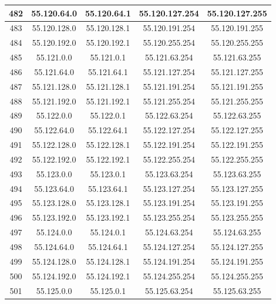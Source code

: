 \documentclass[letterpaper,12pt]{article}
\begin{document}
\begin{center}
\begin{longtable}{|c|c|c|c|c|}
                482 & 55.120.64.0 & 55.120.64.1 & 55.120.127.254 & 55.120.127.255 \\ \hline
                483 & 55.120.128.0 & 55.120.128.1 & 55.120.191.254 & 55.120.191.255 \\ \hline
                484 & 55.120.192.0 & 55.120.192.1 & 55.120.255.254 & 55.120.255.255 \\ \hline
                485 & 55.121.0.0 & 55.121.0.1 & 55.121.63.254 & 55.121.63.255 \\ \hline
                486 & 55.121.64.0 & 55.121.64.1 & 55.121.127.254 & 55.121.127.255 \\ \hline
                487 & 55.121.128.0 & 55.121.128.1 & 55.121.191.254 & 55.121.191.255 \\ \hline
                488 & 55.121.192.0 & 55.121.192.1 & 55.121.255.254 & 55.121.255.255 \\ \hline
                489 & 55.122.0.0 & 55.122.0.1 & 55.122.63.254 & 55.122.63.255 \\ \hline
                490 & 55.122.64.0 & 55.122.64.1 & 55.122.127.254 & 55.122.127.255 \\ \hline
                491 & 55.122.128.0 & 55.122.128.1 & 55.122.191.254 & 55.122.191.255 \\ \hline
                492 & 55.122.192.0 & 55.122.192.1 & 55.122.255.254 & 55.122.255.255 \\ \hline
                493 & 55.123.0.0 & 55.123.0.1 & 55.123.63.254 & 55.123.63.255 \\ \hline
                494 & 55.123.64.0 & 55.123.64.1 & 55.123.127.254 & 55.123.127.255 \\ \hline
                495 & 55.123.128.0 & 55.123.128.1 & 55.123.191.254 & 55.123.191.255 \\ \hline
                496 & 55.123.192.0 & 55.123.192.1 & 55.123.255.254 & 55.123.255.255 \\ \hline
                497 & 55.124.0.0 & 55.124.0.1 & 55.124.63.254 & 55.124.63.255 \\ \hline
                498 & 55.124.64.0 & 55.124.64.1 & 55.124.127.254 & 55.124.127.255 \\ \hline
                499 & 55.124.128.0 & 55.124.128.1 & 55.124.191.254 & 55.124.191.255 \\ \hline
                500 & 55.124.192.0 & 55.124.192.1 & 55.124.255.254 & 55.124.255.255 \\ \hline
                501 & 55.125.0.0 & 55.125.0.1 & 55.125.63.254 & 55.125.63.255 \\ \hline

\end{longtable}
\end{center}
\end{document}
